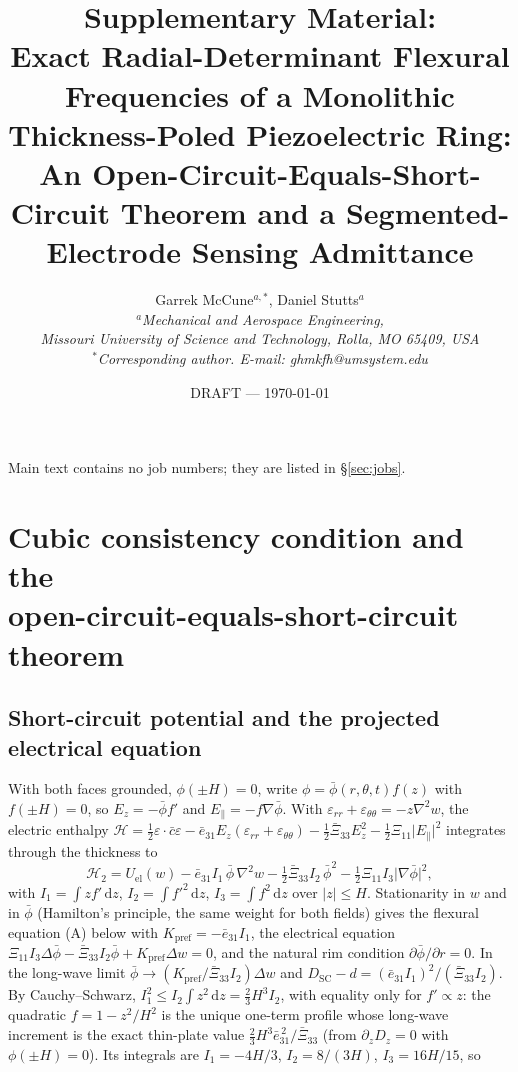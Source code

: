 \documentclass[11pt]{article}
\title{\bfseries Supplementary Material:\\
Exact Radial-Determinant Flexural Frequencies of a Monolithic
Thickness-Poled Piezoelectric Ring: An Open-Circuit-Equals-Short-Circuit Theorem and a Segmented-Electrode Sensing Admittance}
\author{Garrek McCune$^{a,*}$, Daniel Stutts$^{a}$\\
\small\itshape $^a$Mechanical and Aerospace Engineering,\\
Missouri University of Science and Technology, Rolla, MO 65409, USA\\
\small\upshape $^*$Corresponding author. E-mail: ghmkfh@umsystem.edu}
\date{DRAFT --- \today}
\newcommand{\eebar}{\bar{e}_{31}}
\newcommand{\Xibar}{\bar{\Xi}_{33}}
\begin{document}
\maketitle
\noindent Main text contains no job numbers; they are listed in
\S\ref{sec:jobs}.

\section[Cubic consistency condition and the open-circuit-equals-short-circuit theorem]{Cubic consistency condition and the\\ open-circuit-equals-short-circuit theorem}
\label{sec:s1}

\subsection{Short-circuit potential and the projected electrical equation}
With both faces grounded, $\phi(\pm H)=0$, write
$\phi=\bar\phi(r,\theta,t)f(z)$ with $f(\pm H)=0$, so
$E_z=-\bar\phi f'$ and $E_\parallel=-f\nabla\bar\phi$. With
$\varepsilon_{rr}+\varepsilon_{\theta\theta}=-z\nabla^2w$, the electric
enthalpy $\mathcal H=\tfrac12\varepsilon\!\cdot\!\bar c\varepsilon
-\eebar E_z(\varepsilon_{rr}+\varepsilon_{\theta\theta})
-\tfrac12\Xibar E_z^2-\tfrac12\Xi_{11}\lvert E_\parallel\rvert^2$
integrates through the thickness to
\begin{equation}
\mathcal H_2=U_{\mathrm{el}}(w)-\eebar I_1\,\bar\phi\,\nabla^2w
-\tfrac12\Xibar I_2\,\bar\phi^2-\tfrac12\Xi_{11}I_3\lvert\nabla\bar\phi\rvert^2,
\end{equation}
with $I_1=\int zf'\,\mathrm dz$, $I_2=\int f'^2\,\mathrm dz$,
$I_3=\int f^2\,\mathrm dz$ over $\lvert z\rvert\le H$. Stationarity in
$w$ and in $\bar\phi$ (Hamilton's principle, the same weight for both
fields) gives the flexural equation (A) below with
$K_{\mathrm{pref}}=-\eebar I_1$, the electrical equation
$\Xi_{11}I_3\Delta\bar\phi-\Xibar I_2\bar\phi+K_{\mathrm{pref}}\Delta
w=0$, and the natural rim condition $\partial\bar\phi/\partial r=0$. In the
long-wave limit $\bar\phi\to(K_{\mathrm{pref}}/\Xibar I_2)\Delta w$ and
$D_{\mathrm{SC}}-d=(\eebar I_1)^2/(\Xibar I_2)$. By Cauchy--Schwarz,
$I_1^2\le I_2\int z^2\,\mathrm dz=\tfrac23H^3I_2$, with equality only for
$f'\propto z$: the quadratic $f=1-z^2/H^2$ is the unique one-term profile
whose long-wave increment is the exact thin-plate value
$\tfrac23H^3\eebar^{\,2}/\Xibar$ (from $\partial_zD_z=0$ with
$\phi(\pm H)=0$). Its integrals are $I_1=-4H/3$, $I_2=8/(3H)$,
$I_3=16H/15$, so
\end{document}
